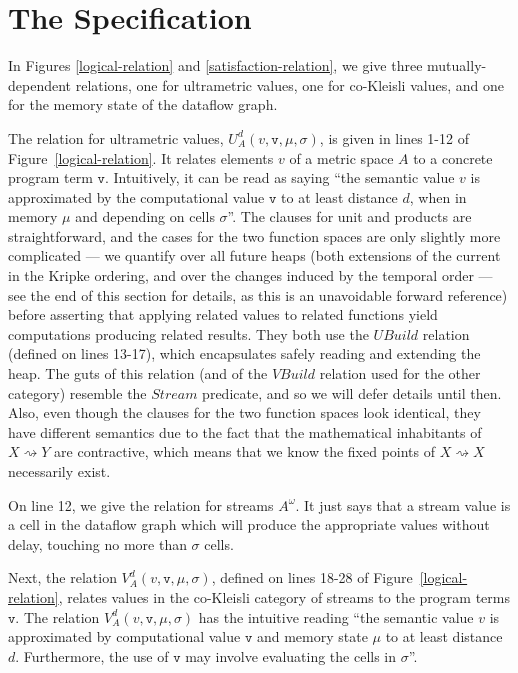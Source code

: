 \documentclass[nocopyrightspace,preprint]{sigplanconf}
\newcommand{\term}[1]{\ensuremath{\mathtt{{#1}}}}
\newcommand{\shrink}{\rightsquigarrow}
\newcommand{\Build}{\mathit{VBuild}}
\newcommand{\UBuild}{\mathit{UBuild}}
\newcommand{\Stream}{\mathit{Stream}}
\begin{document}
\section{The Specification}

In Figures \ref{logical-relation} and \ref{satisfaction-relation}, we
give three mutually-dependent relations, one for ultrametric values,
one for co-Kleisli values, and one for the memory state of the
dataflow graph. 

The relation for ultrametric values, $U^d_A(v, \term{v}, \mu,
\sigma)$, is given in lines 1-12 of Figure~\ref{logical-relation}. It
relates elements $v$ of a metric space $A$ to a concrete program term
\term{v}. Intuitively, it can be read as saying ``the semantic value
$v$ is approximated by the computational value \term{v} to at least
distance $d$, when in memory $\mu$ and depending on cells
$\sigma$''. The clauses for unit and products are straightforward, and
the cases for the two function spaces are only slightly more
complicated --- we quantify over all future heaps (both extensions of
the current in the Kripke ordering, and over the changes induced by
the temporal order --- see the end of this section for details, as
this is an unavoidable forward reference) before asserting that
applying related values to related functions yield computations
producing related results. They both use the $\UBuild$ relation
(defined on lines 13-17), which encapsulates safely reading and
extending the heap. The guts of this relation (and of the $\Build$
relation used for the other category) resemble the $\Stream$
predicate, and so we will defer details until then. Also, even though
the clauses for the two function spaces look identical, they have
different semantics due to the fact that the mathematical inhabitants
of $X \shrink Y$ are contractive, which means that we know the fixed
points of $X \shrink X$ necessarily exist.

On line 12, we give the relation for streams $A^\omega$. It just says
that a stream value is a cell in the dataflow graph which will produce
the appropriate values without delay, touching no more than $\sigma$ cells. 

Next, the relation $V^d_A(v, \term{v}, \mu, \sigma)$, defined on lines
18-28 of Figure~\ref{logical-relation}, relates values in the
co-Kleisli category of streams to the program terms \term{v}. The
relation $V^d_A(v, \term{v}, \mu, \sigma)$ has the intuitive reading
``the semantic value $v$ is approximated by computational value
\term{v} and memory state $\mu$ to at least distance $d$. Furthermore,
the use of \term{v} may involve evaluating the cells in $\sigma$''.
\end{document}
